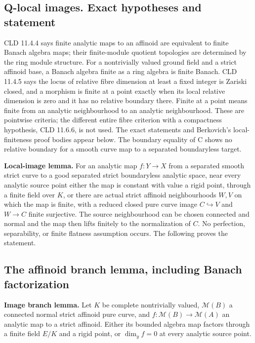 \documentclass[
  10pt,
]{article}
\begin{document}
\subsection{Q-local images. Exact hypotheses and
statement}\label{q-local-images.-exact-hypotheses-and-statement}

CLD 11.4.4 says finite analytic maps to an affinoid are equivalent to
finite Banach algebra maps; their finite-module quotient topologies are
determined by the ring module structure. For a nontrivially valued
ground field and a strict affinoid base, a Banach algebra finite as a
ring algebra is finite Banach. CLD 11.4.5 says the locus of relative
fibre dimension at least a fixed integer is Zariski closed, and a
morphism is finite at a point exactly when its local relative dimension
is zero and it has no relative boundary there. Finite at a point means
finite from an analytic neighbourhood to an analytic neighbourhood.
These are pointwise criteria; the different entire fibre criterion with
a compactness hypothesis, CLD 11.6.6, is not used. The exact statements
and Berkovich's local-finiteness proof bodies appear below. The boundary
equality of C shows no relative boundary for a smooth curve map to a
separated boundaryless target.

\textbf{Local-image lemma.} For an analytic map \(f:Y\to X\) from a
separated smooth strict curve to a good separated strict boundaryless
analytic space, near every analytic source point either the map is
constant with value a rigid point, through a finite field over \(K\), or
there are actual strict affinoid neighbourhoods \(W,V\) on which the map
is finite, with a reduced closed pure curve image \(C\hookrightarrow V\)
and \(W\to C\) finite surjective. The source neighbourhood can be chosen
connected and normal and the map then lifts finitely to the
normalization of \(C\). No perfection, separability, or finite flatness
assumption occurs. The following proves the statement.

\subsection{The affinoid branch lemma, including Banach
factorization}\label{the-affinoid-branch-lemma-including-banach-factorization}

\textbf{Image branch lemma.} Let \(K\) be complete nontrivially valued,
\(\mathcal M(B)\) a connected normal strict affinoid pure curve, and
\(f:\mathcal M(B)\to\mathcal M(A)\) an analytic map to a strict
affinoid. Either its bounded algebra map factors through a finite field
\(E/K\) and a rigid point, or \(\dim_y f=0\) at every analytic source
point.
\end{document}
